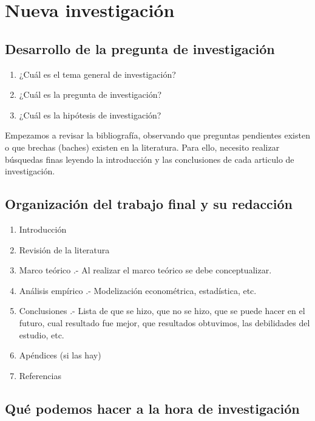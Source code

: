 \chapter{Nueva investigación}

\section*{Desarrollo de la pregunta de investigación}
\begin{enumerate}[1.]
    \item ¿Cuál es el tema general de investigación?
    \item ¿Cuál es la pregunta de investigación?
    \item ¿Cuál es la hipótesis de investigación?
\end{enumerate}

Empezamos a revisar la bibliografía, observando que preguntas pendientes existen o que brechas (baches) existen en la literatura. Para ello, necesito realizar búsquedas finas leyendo la introducción y las conclusiones de cada articulo de investigación.\\


\section*{Organización del trabajo final y su redacción}

\begin{enumerate}[1.]
    \item Introducción
    \item Revisión de la literatura
    \item Marco teórico .- Al realizar el marco teórico se debe conceptualizar.
    \item Análisis empírico .- Modelización econométrica, estadística, etc.
    \item Conclusiones .- Lista de que se hizo, que no se hizo, que se puede hacer en el futuro, cual resultado fue mejor, que resultados obtuvimos, las debilidades del estudio, etc.
    \item Apéndices (si las hay)
    \item Referencias
\end{enumerate}

\section*{Qué podemos hacer a la hora de investigación}

